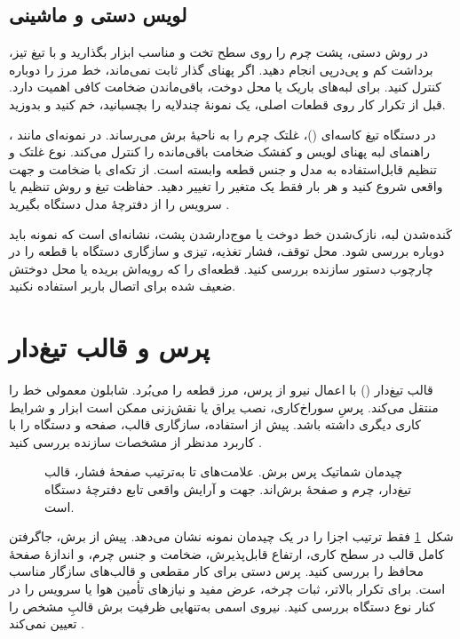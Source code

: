 \subsection{لویس دستی و ماشینی}

در روش دستی، پشت چرم را روی سطح تخت و مناسب ابزار بگذارید و با تیغ تیز، برداشت کم و پی‌درپی انجام دهید. اگر پهنای گذار ثابت نمی‌ماند، خط مرز را دوباره کنترل کنید. برای لبه‌های باریک یا محل دوخت، باقی‌ماندن ضخامت کافی اهمیت دارد. قبل از تکرار کار روی قطعات اصلی، یک نمونۀ چندلایه را بچسبانید، خم کنید و بدوزید.

در دستگاه تیغ کاسه‌ای ()، غلتک چرم را به ناحیۀ برش می‌رساند. در نمونه‌ای مانند ، راهنمای لبه پهنای لویس و کفشک ضخامت باقی‌مانده را کنترل می‌کند. نوع غلتک و تنظیم قابل‌استفاده به مدل و جنس قطعه وابسته است. از تکه‌ای با ضخامت و جهت واقعی شروع کنید و هر بار فقط یک متغیر را تغییر دهید. حفاظت تیغ و روش تنظیم یا سرویس را از دفترچۀ مدل دستگاه بگیرید \cite{sewpro,guard}.

کَنده‌شدن لبه، نازک‌شدن خط دوخت یا موج‌دارشدن پشت، نشانه‌ای است که نمونه باید دوباره بررسی شود. محل توقف، فشار تغذیه، تیزی و سازگاری دستگاه با قطعه را در چارچوب دستور سازنده بررسی کنید. قطعه‌ای را که رویه‌اش بریده یا محل دوختش ضعیف شده برای اتصال باربر استفاده نکنید.

\section{پرس و قالب تیغ‌دار}

قالب تیغ‌دار () با اعمال نیرو از پرس، مرز قطعه را می‌بُرد. شابلون معمولی خط را منتقل می‌کند. پرسِ سوراخ‌کاری، نصب یراق یا نقش‌زنی ممکن است ابزار و شرایط کاری دیگری داشته باشد. پیش از استفاده، سازگاری قالب، صفحه و دستگاه را با کاربرد مدنظر از مشخصات سازنده بررسی کنید \cite{tippmann,weaver}.

\begin{figure}[!htbp]
  \centering
  \PressStackDiagram
  \caption{چیدمان شماتیک پرس برش. علامت‌های  تا  به‌ترتیب صفحۀ فشار، قالب تیغ‌دار، چرم و صفحۀ برش‌اند. جهت و آرایش واقعی تابع دفترچۀ دستگاه است.}
  \label{fig:press}
\end{figure}

شکل~\ref{fig:press} فقط ترتیب اجزا را در یک چیدمان نمونه نشان می‌دهد. پیش از برش، جاگرفتن کامل قالب در سطح کاری، ارتفاع قابل‌پذیرش، ضخامت و جنس چرم، و اندازۀ صفحۀ محافظ را بررسی کنید. پرس دستی برای کار مقطعی و قالب‌های سازگار مناسب است. برای تکرار بالاتر، ثبات چرخه، عرض مفید و نیازهای تأمین هوا یا سرویس را در کنار نوع دستگاه بررسی کنید. نیروی اسمی به‌تنهایی ظرفیت برش قالبِ مشخص را تعیین نمی‌کند \cite{tippmann,weaver}.

